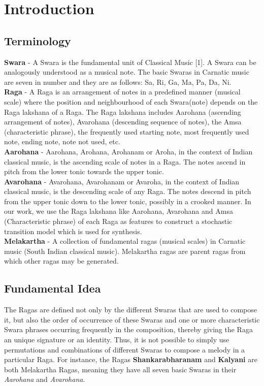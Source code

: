 \documentclass[journal]{IEEEtran}
\begin{document}
\section{Introduction}

\subsection{Terminology}
\textbf{Swara} - A Swara is the fundamental unit of Classical Music [1]. A Swara can be analogously understood as a musical note. The basic Swaras in Carnatic music are seven in number and they are as follows: Sa, Ri, Ga, Ma, Pa, Da, Ni.\\

\textbf{Raga} - A Raga is an arrangement of notes in a predefined manner (musical scale) where the position and neighbourhood of each Swara(note) depends on the Raga lakshana of a Raga. The Raga lakshana includes Aarohana (ascending arrangement of notes), Avarohana (descending sequence of notes), the Amsa (characteristic phrase), the frequently used starting note, most frequently used note, ending note, note not used, etc.\\

\textbf{Aarohana} - Aarohana, Arohana, Arohanam or Aroha, in the context of Indian classical music, is the ascending scale of notes in a Raga. The notes ascend in pitch from the lower tonic towards the upper tonic.\\

\textbf{Avarohana} - Avarohana, Avarohanam or Avaroha, in the context of Indian classical music, is the descending scale of any Raga. The notes descend in pitch from the upper tonic down to the lower tonic, possibly in a crooked manner.
In our work, we use the Raga lakshana like Aarohana, Avarohana and Amsa (Characteristic phrase) of each Raga as features to construct a stochastic transition model which is used for synthesis.\\

\textbf{Melakartha} - A collection of fundamental ragas (musical scales) in Carnatic music (South Indian classical music). Melakartha ragas are parent ragas from which other ragas may be generated.

\subsection{Fundamental Idea}
The Ragas are defined not only by the different Swaras that are used to compose it, but also the order of occurrence of these Swaras and one or more characteristic Swara phrases occurring frequently in the composition, thereby giving the Raga an unique signature or an identity. Thus, it is not possible to simply use permutations and combinations of different Swaras to compose a melody in a particular Raga.  For instance, the Ragas \textbf{Shankarabharanam} and \textbf{Kalyani} are both Melakartha Ragas, meaning they have all seven basic Swaras in their \emph{Aarohana} and \emph{Avarohana}.\\
\end{document}
